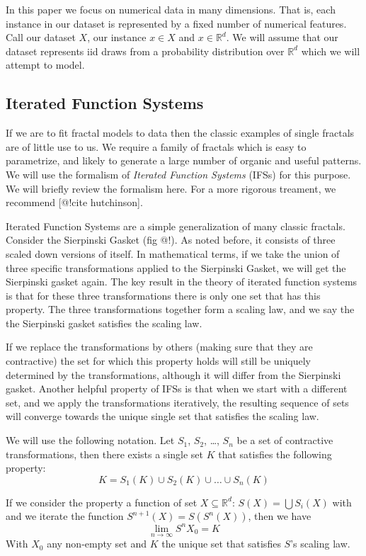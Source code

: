 \documentclass[11pt]{article}
\theoremstyle{definition}
\begin{document}
In this paper we focus on numerical data in many dimensions. That is, each instance in our dataset is represented by a fixed number of numerical features. Call our dataset $X$, our instance $x \in X$ and $x \in {\mathbb R}^d$. We will assume that our dataset represents iid draws from a probability distribution over ${\mathbb R}^d$ which we will attempt to model.

\subsection{Iterated Function Systems}

If we are to fit fractal models to data then the classic examples of single fractals are of little use to us. We require a family of fractals which is easy to  
parametrize, and likely to generate a large number of organic and useful patterns. We will use the formalism of \emph{Iterated Function Systems} (IFSs) for this purpose. We will briefly review the formalism here. For a more rigorous treament, we recommend [@!cite hutchinson].

Iterated Function Systems are a simple generalization of many classic fractals. Consider the Sierpinski Gasket (fig @!). As noted before, it consists of three scaled down versions of itself. In mathematical terms, if we take the union of three specific transformations applied to the Sierpinski Gasket, we will get the Sierpinski gasket again. The key result in the theory of iterated function systems is that for these three transformations there is only one set that has this property. The three transformations together form a scaling law, and we say the the Sierpinski gasket satisfies the scaling law.

If we replace the transformations by others (making sure that they are contractive) the set for which this property holds will still be uniquely determined by the transformations, although it will differ from the Sierpinski gasket. Another helpful property of IFSs is that when we start with a different set, and we apply the transformations iteratively, the resulting sequence of sets will converge towards the unique single set that satisfies the scaling law.

We will use the following notation. Let $S_1$, $S_2$, \ldots, $S_n$ be a set of contractive transformations, then there exists a single set $K$ that satisfies the following property:
\[
K = S_1(K) \cup S_2(K) \cup \ldots \cup S_n(K)
\] 

If we consider the property a function of set $X \subseteq {\mathbb R}^d$: $S(X) = \bigcup S_i(X)$ with and we iterate the function $S^{n+1}(X) = S(S^n(X))$, then we have 
\[
\lim_{n \rightarrow \infty} S^n{X_0} = K
\]
With $X_0$ any non-empty set and $K$ the unique set that satisfies $S$'s scaling law.
\end{document}

